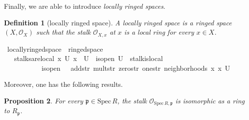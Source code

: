 \documentclass[12pt]{scrartcl}
\newtheorem{proposition}{Proposition}[section]
\newtheorem{definition}[proposition]{Definition}
\def\spec{\text{Spec}\,R}
\begin{document}
Finally, we are able to introduce \emph{locally ringed spaces}.

\begin{definition}[locally ringed space]
	A locally ringed space is a ringed space $(X, \mathscr{O}_X)$ such that the stalk $\mathscr{O}_{X, x}$ at $x$ is a local ring for every $x \in X$.
\end{definition}

\begin{isabelle}
\isamarkupfalse%
\ locally{\isacharunderscore}{\kern0pt}ringed{\isacharunderscore}{\kern0pt}space\ {\isacharequal}{\kern0pt}\ ringed{\isacharunderscore}{\kern0pt}space\ {\isacharplus}{\kern0pt}\isanewline
\ \ \ stalks{\isacharunderscore}{\kern0pt}are{\isacharunderscore}{\kern0pt}local{\isacharcolon}{\kern0pt}\ {\isachardoublequoteopen}{\isasymAnd}x\ U{\isachardot}{\kern0pt}\ x\ {\isasymin}\ U\ {\isasymLongrightarrow}\ is{\isacharunderscore}{\kern0pt}open\ U\ {\isasymLongrightarrow}\ stalk{\isachardot}{\kern0pt}is{\isacharunderscore}{\kern0pt}local\ \isanewline
\ \ \ \ \ \ \ \ \ \ \ is{\isacharunderscore}{\kern0pt}open\ {\isasymFF}\ {\isasymrho}\ add{\isacharunderscore}{\kern0pt}str\ mult{\isacharunderscore}{\kern0pt}str\ zero{\isacharunderscore}{\kern0pt}str\ one{\isacharunderscore}{\kern0pt}str\ {\isacharparenleft}{\kern0pt}neighborhoods\ x{\isacharparenright}{\kern0pt}\ x\ U{\isachardoublequoteclose}
\end{isabelle}

Moreover, one has the following results.

\begin{proposition}
	For every $\mathfrak{p} \in \text{Spec}\,R$, the stalk $\mathscr{O}_{\spec, \mathfrak{p}}$ is isomorphic as a ring to $R_{\mathfrak{p}}$.	
\end{proposition}	
\end{document}
